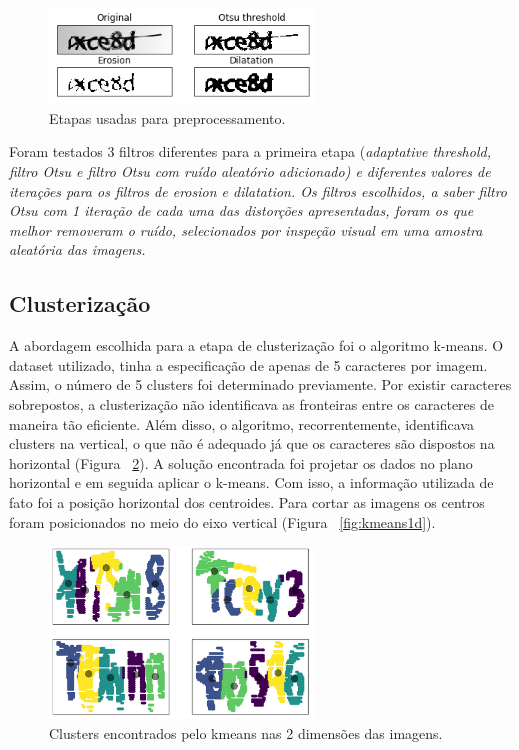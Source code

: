 \documentclass[11pt]{article}
\begin{document}
  \begin{figure}[H]
        {\centering
        \includegraphics[width=70mm]{images/preproc.png}
        \caption{Etapas usadas para preprocessamento.}
        \label{fig:preproc}\par}
  \end{figure}

Foram testados 3 filtros diferentes para a primeira etapa (\em adaptative threshold\em , filtro Otsu e filtro Otsu com ruído aleatório adicionado) e diferentes valores de iterações para os filtros de \em erosion \em e \em dilatation\em . Os filtros escolhidos, a saber filtro Otsu com 1 iteração de cada uma das distorções apresentadas, foram os que melhor removeram o ruído, selecionados por inspeção visual em uma amostra aleatória das imagens.


\subsection{Clusterização}
\label{sec:cluteri}

A abordagem escolhida para a etapa de clusterização foi o algoritmo k-means. O dataset utilizado, tinha a especificação de apenas de 5 caracteres por imagem. Assim, o número de 5 clusters foi determinado previamente. Por existir caracteres sobrepostos, a clusterização não identificava as fronteiras entre os caracteres de maneira tão eficiente. Além disso, o algoritmo, recorrentemente, identificava clusters na vertical, o que não é adequado já que os caracteres são dispostos na horizontal (Figura ~\ref{fig:kmeans2d}). A solução encontrada foi projetar os dados no plano horizontal e em seguida aplicar o k-means. Com isso, a informação utilizada de fato foi a posição horizontal dos centroides. Para cortar as imagens os centros foram posicionados no meio do eixo vertical (Figura ~\ref{fig:kmeans1d}).

  \begin{figure}[H]
        {\centering
        \includegraphics[width=70mm]{images/2dkmeans.png}
        \caption{Clusters encontrados pelo kmeans nas 2 dimensões das imagens.}
        \label{fig:kmeans2d}\par}
  \end{figure}
\end{document}
